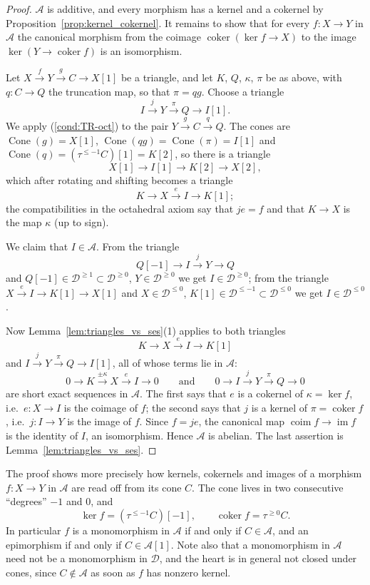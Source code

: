 \documentclass[12pt]{amsart}
\newcommand{\condref}[1]{\textup{(\ref{#1})}}
\newenvironment{remark}{{\textbf{Remark.}}}
\numberwithin{theorem}{section}
\theoremstyle{definition}
\newcommand{\calA}{\mathcal{A}}
\newcommand{\calD}{\mathcal{D}}
\newcommand{\Dle}[1]{\calD^{\leqslant #1}}
\newcommand{\Dge}[1]{\calD^{\geqslant #1}}
\newcommand{\Cone}{\operatorname{Cone}}
\begin{document}
	\begin{proof}
		$\calA$ is additive, and every morphism has a kernel and a cokernel by Proposition~\ref{prop:kernel_cokernel}.
		It remains to show that for every $f \colon X \to Y$ in $\calA$ the canonical morphism from the coimage $\operatorname{coker}(\ker f \to X)$ to the image $\ker(Y \to \operatorname{coker} f)$ is an isomorphism.
		
		Let $X \xrightarrow{f} Y \xrightarrow{g} C \to X[1]$ be a triangle, and let $K$, $Q$, $\kappa$, $\pi$ be as above, with $q \colon C \to Q$ the truncation map, so that $\pi = q g$.
		Choose a triangle 
		\[
		I \xrightarrow{j} Y \xrightarrow{\pi} Q \to I[1].
		\]
		We apply \condref{cond:TR-oct} to the pair $Y \xrightarrow{g} C \xrightarrow{q} Q$.
		The cones are $\Cone(g) = X[1]$, $\Cone(q g) = \Cone(\pi) = I[1]$ and $\Cone(q) = (\tau^{\leqslant -1} C)[1] = K[2]$, so there is a triangle
		\[
		X[1] \to I[1] \to K[2] \to X[2] ,
		\]
		which after rotating and shifting becomes a triangle 
		\[
		K \to X \xrightarrow{e} I \to K[1];
		\]
		the compatibilities in the octahedral axiom say that $j e = f$ and that $K \to X$ is the map $\kappa$ (up to sign).
		
		We claim that $I \in \calA$.
		From the triangle 
		\[
		Q[-1] \to I \xrightarrow{j} Y \to Q
		\] 
		and $Q[-1] \in \Dge{1} \subset \Dge{0}$, $Y \in \Dge{0}$ we get $I \in \Dge{0}$;
		from the triangle $X \xrightarrow{e} I \to K[1] \to X[1]$ and $X \in \Dle{0}$, $K[1] \in \Dle{-1} \subset \Dle{0}$ we get $I \in \Dle{0}$.
		
		Now Lemma~\ref{lem:triangles_vs_ses}(1) applies to both triangles 
		\[
		K \to X \xrightarrow{e} I \to K[1]
		\] and $I \xrightarrow{j} Y \xrightarrow{\pi} Q \to I[1]$, all of whose terms lie in $\calA$:
		\[
		0 \to K \xrightarrow{\pm\kappa} X \xrightarrow{e} I \to 0
		\qquad\text{and}\qquad
		0 \to I \xrightarrow{j} Y \xrightarrow{\pi} Q \to 0
		\]
		are short exact sequences in $\calA$.
		The first says that $e$ is a cokernel of $\kappa = \ker f$, i.e.\ $e \colon X \to I$ is the coimage of $f$;
		the second says that $j$ is a kernel of $\pi = \operatorname{coker} f$, i.e.\ $j \colon I \to Y$ is the image of $f$.
		Since $f = j e$, the canonical map $\operatorname{coim} f \to \operatorname{im} f$ is the identity of $I$, an isomorphism.
		Hence $\calA$ is abelian.
		The last assertion is Lemma~\ref{lem:triangles_vs_ses}.
	\end{proof}
	
	\begin{remark}
		The proof shows more precisely how kernels, cokernels and images of a morphism $f \colon X \to Y$ in $\calA$ are read off from its cone $C$.
		The cone lives in two consecutive ``degrees'' $-1$ and $0$, and
		\[
		\ker f = (\tau^{\leqslant -1} C)[-1], \qquad \operatorname{coker} f = \tau^{\geqslant 0} C .
		\]
		In particular $f$ is a monomorphism in $\calA$ if and only if $C \in \calA$, and an epimorphism if and only if $C \in \calA[1]$.
		Note also that a monomorphism in $\calA$ need not be a monomorphism in $\calD$, and the heart is in general not closed under cones, since $C \notin \calA$ as soon as $f$ has nonzero kernel.
	\end{remark}
\end{document}
